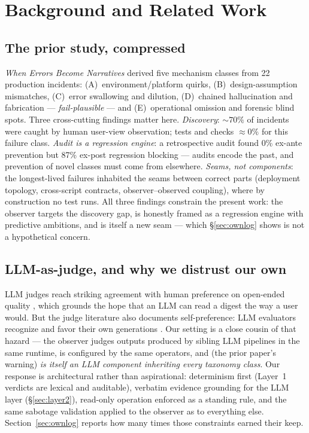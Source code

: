 \documentclass[11pt]{article}
\newcommand{\failplausible}{\emph{fail-plausible}}
\begin{document}
\section{Background and Related Work}
\label{sec:background}

\subsection{The prior study, compressed}

\emph{When Errors Become Narratives} \cite{wu2026narratives} derived
five mechanism classes from 22 production incidents:
(A)~environment/platform quirks, (B)~design-assumption mismatches,
(C)~error swallowing and dilution, (D)~chained hallucination and
fabrication --- \failplausible{} --- and (E)~operational omission and
forensic blind spots. Three cross-cutting findings matter here.
\emph{Discovery}: ${\sim}70\%$ of incidents were caught by human
user-view observation; tests and checks ${\approx}0\%$ for this failure
class. \emph{Audit is a regression engine}: a retrospective audit found
0\% ex-ante prevention but 87\% ex-post regression blocking --- audits
encode the past, and prevention of novel classes must come from
elsewhere. \emph{Seams, not components}: the longest-lived failures
inhabited the seams between correct parts (deployment topology,
cross-script contracts, observer--observed coupling), where by
construction no test runs. All three findings constrain the present
work: the observer targets the discovery gap, is honestly framed as a
regression engine with predictive ambitions, and is itself a new
seam --- which \S\ref{sec:ownlog} shows is not a hypothetical concern.

\subsection{LLM-as-judge, and why we distrust our own}
\label{sec:judge}

LLM judges reach striking agreement with human preference on open-ended
quality \cite{zheng2023mtbench}, which grounds the hope that an LLM can
read a digest the way a user would. But the judge literature also
documents self-preference: LLM evaluators recognize and favor their own
generations \cite{panickssery2024self}. Our setting is a close cousin
of that hazard --- the observer judges outputs produced by sibling LLM
pipelines in the same runtime, is configured by the same operators, and
(the prior paper's warning) \emph{is itself an LLM component inheriting
every taxonomy class}. Our response is architectural rather than
aspirational: determinism first (Layer~1 verdicts are lexical and
auditable), verbatim evidence grounding for the LLM layer
(\S\ref{sec:layer2}), read-only operation enforced as a standing rule,
and the same sabotage validation applied to the observer as to
everything else. Section~\ref{sec:ownlog} reports how many times those
constraints earned their keep.
\end{document}
